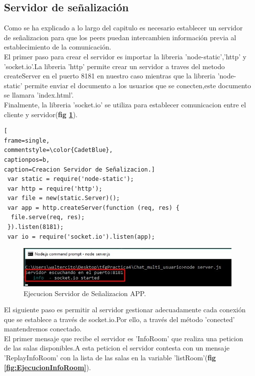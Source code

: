 
\subsection{Servidor de señalización}
Como se ha explicado a lo largo del capitulo es necesario establecer un servidor de señalizacion para que los peers puedan intercambien información previa al establecimiento de la comunicación.
\\El primer paso para crear el servidor es importar la libreria 'node-static','http' y 'socket.io'.La libreria 'http' permite crear un servidor a traves del metodo createServer en el puerto 8181 en nuestro caso mientras que la libreria 'node-static' permite enviar el documento a los usuarios que se conecten,este documento se llamara 'index.html'.
\\Finalmente, la libreria 'socket.io' se utiliza para establecer comunicacion entre el cliente y servidor(\textbf{fig \ref{fig:EjecucionServer}}).
\begin{lstlisting}[
frame=single,
commentstyle=\color{CadetBlue},
captionpos=b,
caption=Creacion Servidor de Señalizacion.]
 var static = require('node-static');
 var http = require('http');
 var file = new(static.Server)();
 var app = http.createServer(function (req, res) {
  file.serve(req, res);
 }).listen(8181);
 var io = require('socket.io').listen(app);
\end{lstlisting}
\begin{figure}[!h]
\begin{center}
   \includegraphics[width=0.6\linewidth]{Figures/InicioServidor}
	\decoRule
	\caption[ServidorSeñalizacion]{Ejecucion Servidor de Señalizacion APP.}
\label{fig:EjecucionServer}
\end{center}
\end{figure}
El siguiente paso es permitir al servidor gestionar adecuadamente cada conexión que se establece a través de socket.io.Por ello, a través del método 'conected' mantendremos conectado.
\\El primer mensaje que recibe el servidor es 'InfoRoom' que realiza una peticion de las salas disponibles.A esta peticion el servidor contesta con un mensaje 'ReplayInfoRoom' con la lista de las salas en la variable 'listRoom'(\textbf{fig \ref{fig:EjecucionInfoRoom}}).
